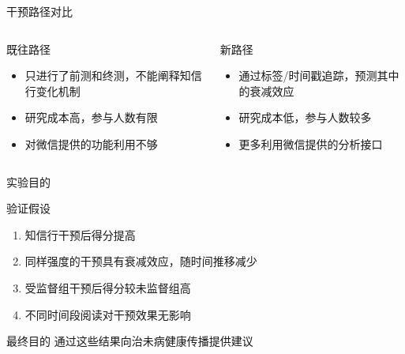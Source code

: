 \begin{frame}{干预路径对比}
\begin{columns}
    \begin{column}{0.5\textwidth}
        \begin{block}{既往路径}
            \begin{itemize}
                \item 只进行了前测和终测，不能阐释知信行变化机制
                \item 研究成本高，参与人数有限
                \item 对微信提供的功能利用不够
            \end{itemize}
        \end{block}
    \end{column}
    \begin{column}{0.5\textwidth}
       \begin{block}{新路径}
          \begin{itemize}
              \item 通过标签/时间戳追踪，预测其中的衰减效应
              \item 研究成本低，参与人数较多
              \item 更多利用微信提供的分析接口
          \end{itemize}
      \end{block}
    \end{column}
\end{columns}
\end{frame}

\begin{frame}{实验目的}
\begin{alertblock}{验证假设}
    
    \begin{enumerate}
        \item 知信行干预后得分提高
        \item 同样强度的干预具有衰减效应，随时间推移减少
        \item 受监督组干预后得分较未监督组高
        \item 不同时间段阅读对干预效果无影响
    \end{enumerate}
\end{alertblock}
\begin{exampleblock}{最终目的}
    通过这些结果向治未病健康传播提供建议
\end{exampleblock}
\end{frame}

